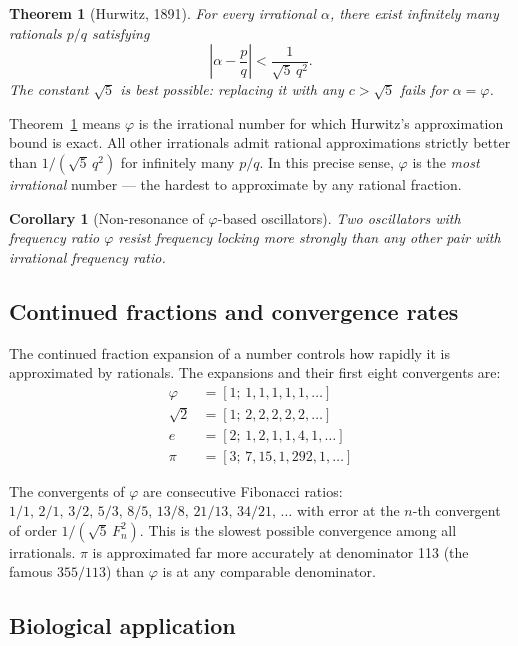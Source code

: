 \documentclass[11pt,letterpaper]{article}
\newtheorem{theorem}{Theorem}
\newtheorem{corollary}{Corollary}
\theoremstyle{definition}
\theoremstyle{remark}
\begin{document}
\begin{theorem}[Hurwitz, 1891]\label{thm:hurwitz}
For every irrational $\alpha$, there exist infinitely many rationals $p/q$ satisfying
\[
\left|\alpha - \frac{p}{q}\right| < \frac{1}{\sqrt{5}\, q^2}.
\]
The constant $\sqrt{5}$ is best possible: replacing it with any $c > \sqrt{5}$ fails for $\alpha = \varphi$.
\end{theorem}

\noindent Theorem~\ref{thm:hurwitz} means $\varphi$ is the irrational number for which Hurwitz's
approximation bound is exact. All other irrationals admit rational approximations strictly better
than $1/(\sqrt{5}\,q^2)$ for infinitely many $p/q$. In this precise sense, $\varphi$ is the
\emph{most irrational} number --- the hardest to approximate by any rational fraction.

\begin{corollary}[Non-resonance of $\varphi$-based oscillators]
Two oscillators with frequency ratio $\varphi$ resist frequency locking more strongly than any
other pair with irrational frequency ratio.
\end{corollary}

\subsection{Continued fractions and convergence rates}

The continued fraction expansion of a number controls how rapidly it is approximated by rationals.
The expansions and their first eight convergents are:
\begin{align*}
\varphi &= [1;\, 1, 1, 1, 1, 1, \ldots] \\
\sqrt{2} &= [1;\, 2, 2, 2, 2, 2, \ldots] \\
e       &= [2;\, 1, 2, 1, 1, 4, 1, \ldots] \\
\pi     &= [3;\, 7, 15, 1, 292, 1, \ldots]
\end{align*}

The convergents of $\varphi$ are consecutive Fibonacci ratios:
$1/1,\, 2/1,\, 3/2,\, 5/3,\, 8/5,\, 13/8,\, 21/13,\, 34/21,\, \ldots$
with error at the $n$-th convergent of order $1/(\sqrt{5}\,F_n^2)$. This is the slowest possible
convergence among all irrationals. $\pi$ is approximated far more accurately at denominator 113
(the famous $355/113$) than $\varphi$ is at any comparable denominator.

\subsection{Biological application}
\end{document}
